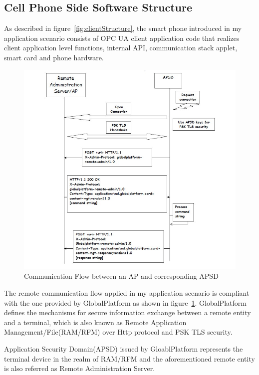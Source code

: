 \subsection{Cell Phone Side Software Structure}
As described in figure~\ref{fig:clientStructure}, the smart phone introduced in my application scenario consists of OPC UA client application code that realizes client application level functions, internal API, communication stack applet, smart card and phone hardware.

\begin{figure}[!htb]
	\centering
	\includegraphics[width=1.2\textwidth]{apsd.jpg}
		\caption{Communication Flow between an AP and corresponding APSD\cite{ramGP}}
	\label{fig:apsd}
\end{figure}
The remote communication flow applied in my application scenario is compliant with the one provided by GlobalPlatform as shown in figure~\ref{fig:apsd}. GlobalPlatform defines the mechanisms for secure information exchange between a remote entity and a terminal, which is also known as Remote Application Management/File(RAM/RFM) over Http protocol and PSK TLS security. 

Application Security Domain(APSD) issued by GloablPlatform represents the terminal device in the realm of RAM/RFM and the aforementioned remote entity  is also referred as Remote Administration Server. 

